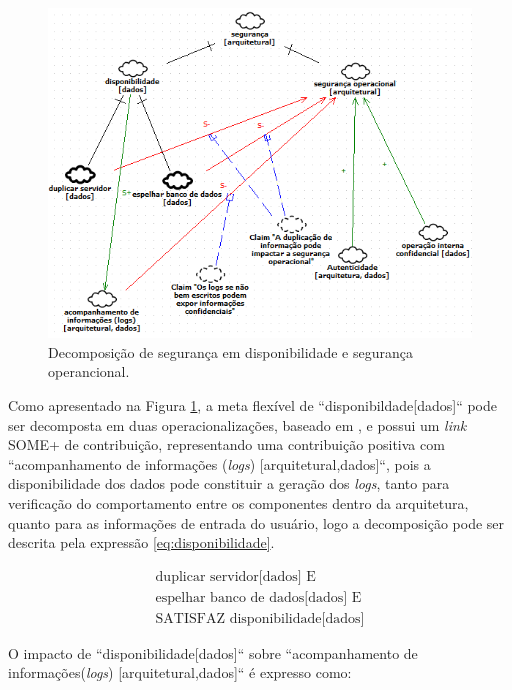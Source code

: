 \begin{figure}[h!]
	\centering
	\includegraphics[keepaspectratio=true,scale=0.8]{figuras/SIG-SO-e-Disponibilidade.PNG}
	\caption{Decomposição de segurança em disponibilidade e segurança operancional.}
	\label{DecomposicaoDisponibilidade}
\end{figure}

Como apresentado na Figura \ref{DecomposicaoDisponibilidade}, a meta flexível de ``disponibildade[dados]`` pode ser decomposta em duas operacionalizações, baseado em \cite{affleck2012supporting}, e possui um \textit{link} SOME+ de contribuição, representando uma contribuição positiva com ``acompanhamento de informações (\textit{logs}) [arquitetural,dados]``, pois a disponibilidade dos dados pode constituir a geração dos \textit{logs}, tanto para verificação do comportamento entre os componentes dentro da arquitetura, quanto para as informações de entrada do usuário, logo a decomposição pode ser descrita pela expressão \ref{eq:disponibilidade}.

\pagebreak

\begin{eqnarray}
\label{eq:disponibilidade}
\textrm{duplicar servidor[dados] E}  \nonumber\\
\textrm{espelhar banco de dados[dados] E} \nonumber \\
\textrm{SATISFAZ disponibilidade[dados]} 
\end{eqnarray}

O impacto de ``disponibilidade[dados]`` sobre ``acompanhamento de informações(\textit{logs}) [arquitetural,dados]`` é expresso como:


